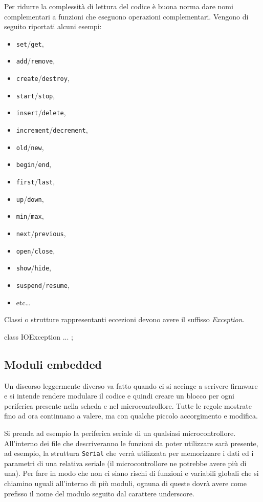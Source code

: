 Per ridurre la complessità di lettura del codice è buona norma dare nomi complementari a funzioni che eseguono operazioni complementari.
Vengono di seguito riportati alcuni esempi:
\begin{itemize}
	\item \texttt{set}/\texttt{get},
	\item \texttt{add}/\texttt{remove},
	\item \texttt{create}/\texttt{destroy}, 
	\item \texttt{start}/\texttt{stop},
	\item \texttt{insert}/\texttt{delete},
	\item \texttt{increment}/\texttt{decrement},
	\item \texttt{old}/\texttt{new},
	\item \texttt{begin}/\texttt{end},
	\item \texttt{first}/\texttt{last},
	\item \texttt{up}/\texttt{down},
	\item \texttt{min}/\texttt{max},
	\item \texttt{next}/\texttt{previous},
	\item \texttt{open}/\texttt{close},
	\item \texttt{show}/\texttt{hide},
	\item \texttt{suspend}/\texttt{resume},
	\item etc\dots
\end{itemize}

Classi o strutture rappresentanti eccezioni devono avere il suffisso \emph{Exception}.

\begin{minipage}[t]{\rbwidth}
\begin{RightCode}
class IOException
{
	...
};
\end{RightCode}
\end{minipage}%

\subsection{Moduli embedded}

Un discorso leggermente diverso va fatto quando ci si accinge a scrivere firmware e si intende rendere modulare il codice e quindi creare un blocco per ogni periferica presente nella scheda e nel microcontrollore.
Tutte le regole mostrate fino ad ora continuano a valere, ma con qualche piccolo accorgimento e modifica.

Si prenda ad esempio la periferica seriale di un qualsiasi microcontrollore.
All'interno dei file che descriveranno le funzioni da poter utilizzare sarà presente, ad esempio, la struttura \texttt{Serial} che verrà utilizzata per memorizzare i dati ed i parametri di una relativa seriale (il microcontrollore ne potrebbe avere più di una).
Per fare in modo che non ci siano rischi di funzioni e variabili globali che si chiamino uguali all'interno di più moduli, ognuna di queste dovrà avere come prefisso il nome del modulo seguito dal carattere underscore.

